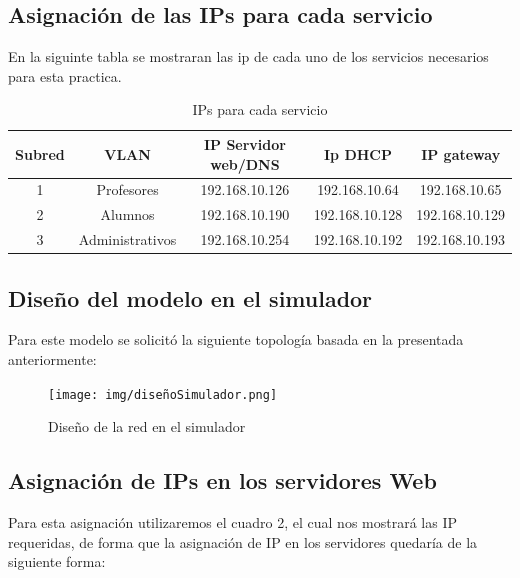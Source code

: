     \subsection*{Asignación de las IPs para cada servicio}

    En la siguinte tabla se mostraran las ip de cada uno de los servicios necesarios para esta practica.

    \begin{table}[H]
        \begin{center}
            \begin{tabular}{ c | c | c | c | c }
                \textbf{Subred} & \textbf{VLAN} & \textbf{IP Servidor web/DNS} & \textbf{Ip DHCP} & \textbf{IP gateway}\\ \hline
                1 & Profesores & 192.168.10.126 & 192.168.10.64 & 192.168.10.65\\
                2 & Alumnos & 192.168.10.190 & 192.168.10.128 & 192.168.10.129\\
                3 & Administrativos & 192.168.10.254 & 192.168.10.192 & 192.168.10.193\\
            \end{tabular}
            \caption{IPs para cada servicio}
            \label{tab:redes}
        \end{center}
    \end{table}


    \subsection*{Diseño del modelo en el simulador}
    Para este modelo se solicitó la siguiente topología basada en la presentada anteriormente:
    
    \begin{figure}[H]
        \centering
        \texttt{[image: img/diseñoSimulador.png]}
        \caption{Diseño de la red en el simulador}
        \label{fig:disSim}
    \end{figure}
    
    \subsection*{Asignación de IPs en los servidores Web}
    Para esta asignación utilizaremos el cuadro 2, el cual nos mostrará las IP requeridas, de forma que la asignación de IP en los servidores quedaría de la siguiente forma:
    
